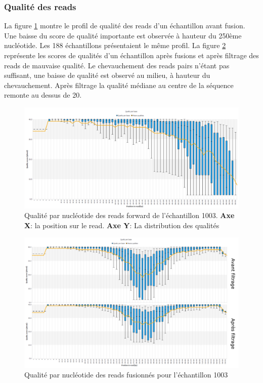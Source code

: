 \documentclass[12pt,a4paper]{article}
\begin{document}
\subsubsection{Qualité des reads}
La figure \ref{fastqt} montre le profil de qualité des reads d’un échantillon avant fusion. Une baisse du score de qualité importante est observée à hauteur du 250ème nucléotide. Les 188 échantillons présentaient le même profil.
La figure \ref{fastqt_after} représente les scores de qualités d’un échantillon après fusions et après filtrage des reads de mauvaise qualité. Le chevauchement des reads pairs n'étant pas suffisant, une baisse de qualité est observé au milieu, à hauteur du chevauchement. Après filtrage la qualité médiane au centre de la séquence remonte au dessus de 20.


\begin{figure}[ht]
\begin{center}
\includegraphics[scale=0.45]{img/1003_forward.png}\hfill
\end{center}
\caption{Qualité par nucléotide des reads forward de l'échantillon 1003. \textbf{Axe X}: la position sur le read. \textbf{Axe Y}: La distribution des qualités}
\label{fastqt}
\end{figure}


\begin{figure}[ht]
\begin{center}
\includegraphics[scale=0.45]{img/duo_merging.png}\hfill
\end{center}
\caption{Qualité par nucléotide des reads fusionnés pour l'échantillon 1003}
\label{fastqt_after}
\end{figure}
\end{document}
